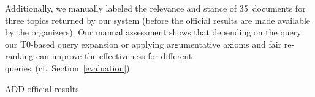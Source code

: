Additionally, we manually labeled the relevance and stance of 35~documents for three topics returned by our system (before the official results are made available by the organizers). Our manual assessment shows that depending on the query our T0-based query expansion or applying argumentative axioms and fair re-ranking can improve the effectiveness for different queries~(cf.\ Section~\ref{evaluation}).

{\color{red} ADD official results}

